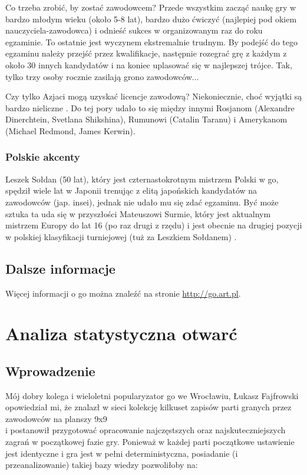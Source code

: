 \documentclass[11pt,leqno]{article}
\begin{document}
Co trzeba zrobić, by zostać zawodowcem? Przede wszystkim zacząć naukę gry w bardzo młodym wieku (około 5-8 lat), 
bardzo dużo ćwiczyć (najlepiej pod okiem nauczyciela-zawodowca) i odnieść sukces w organizowanym raz do roku egzaminie. 
To ostatnie jest wyczynem ekstremalnie trudnym. By podejść do tego egzaminu należy przejść przez kwalifikacje, następnie 
rozegrać grę z każdym z około 30 innych kandydatów i na koniec uplasować się w najlepszej trójce. 
Tak, tylko trzy osoby rocznie zasilają grono zawodowców...

Czy tylko Azjaci mogą uzyskać licencje zawodową? Niekoniecznie, choć wyjątki są bardzo nieliczne \cite{gopros}. Do tej pory udało
to się między innymi Rosjanom (Alexandre Dinerchtein, Svetlana Shikshina), Rumunowi (Catalin Taranu) i Amerykanom 
(Michael Redmond, James Kerwin).

\subsubsection{Polskie akcenty}

Leszek Sołdan (50 lat), który jest czternastokrotnym mistrzem Polski w go, spędził wiele lat w Japonii 
trenując z elitą japońskich kandydatów na zawodowców (jap. insei), jednak nie udało mu się zdać egzaminu. Być może sztuka 
ta uda się w przyszłości Mateuszowi Surmie, który jest aktualnym mistrzem Europy do lat 16 (po raz drugi z rzędu) i jest 
obecnie na drugiej pozycji w polskiej klasyfikacji turniejowej (tuż za Leszkiem Sołdanem) \cite{ranking}.

\subsection{Dalsze informacje}

Więcej informacji o go można znaleźć na stronie \url{http://go.art.pl}.

\section{Analiza statystyczna otwarć}

\subsection{Wprowadzenie}

Mój dobry kolega i wieloletni popularyzator go we Wrocławiu, Łukasz Fajfrowski opowiedział mi, że znalazł w sieci kolekcję 
kilkuset zapisów parti granych przez zawodowców na planszy 9x9 
\\ i postanowił przygotować opracowanie najczęstszych oraz
najskuteczniejszych zagrań w początkowej fazie gry. Ponieważ w każdej parti początkowe ustawienie jest identyczne i gra
jest w pełni deterministyczna, posiadanie (i przeanalizowanie) takiej bazy wiedzy pozwoliłoby na:
\end{document}
